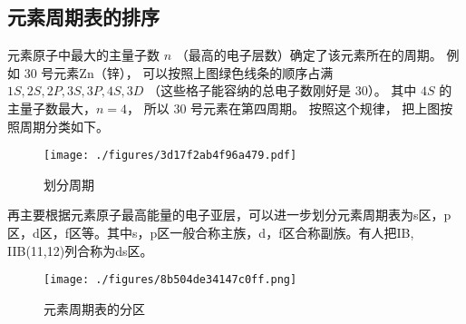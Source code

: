 \subsection{元素周期表的排序}


元素原子中最大的主量子数 $n$ （最高的电子层数）确定了该元素所在的周期。 例如 30 号元素Zn（锌）， 可以按照上图绿色线条的顺序占满 $1S, 2S, 2P, 3S, 3P, 4S, 3D$ （这些格子能容纳的总电子数刚好是 30）。 其中 $4S$ 的主量子数最大，$n=4$， 所以 30 号元素在第四周期。 按照这个规律， 把上图按照周期分类如下。
\begin{figure}[ht]
\centering
\texttt{[image: ./figures/3d17f2ab4f96a479.pdf]}
\caption{划分周期} \label{fig_Ptable_5}
\end{figure}

再主要根据元素原子最高能量的电子亚层，可以进一步划分元素周期表为s区，p区，d区，f区等。其中s，p区一般合称主族，d，f区合称副族。有人把IB, IIB(11,12)列合称为ds区。
\begin{figure}[ht]
\centering
\texttt{[image: ./figures/8b504de34147c0ff.png]}
\caption{元素周期表的分区} \label{fig_Ptable_3}
\end{figure}


